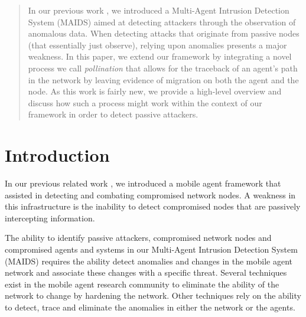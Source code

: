 \documentclass{acm_proc_article-sp}
\begin{document}
\maketitle
\begin{abstract}
In our previous work \cite{kackley09}, we introduced a Multi-Agent Intrusion Detection System (MAIDS) aimed at detecting attackers through the observation of anomalous data.  When detecting attacks that originate from passive nodes (that essentially just observe), relying upon anomalies presents a major weakness.  In this paper, we extend our framework by integrating a novel process we call {\it pollination} that allows for the traceback of an agent's path in the network by leaving evidence of migration on both the agent and the node.  As this work is fairly new, we provide a high-level overview and discuss how such a process might work within the context of our framework in order to detect passive attackers.
\end{abstract}




\section{Introduction}

In our previous related work \cite{kackley09}, we introduced a mobile agent framework that assisted in detecting and combating compromised network nodes.  A weakness in this infrastructure is the inability to detect compromised nodes that are passively intercepting information.

The ability to identify passive attackers, compromised network nodes and compromised agents and systems in our Multi-Agent Intrusion Detection System (MAIDS) requires the ability detect anomalies and changes in the mobile agent network and associate these changes with a specific threat.  Several techniques exist in the mobile agent research community to eliminate the ability of the network to change by hardening the network.  Other techniques rely on the ability to detect, trace and eliminate the anomalies in either the network or the agents.
\end{document}
